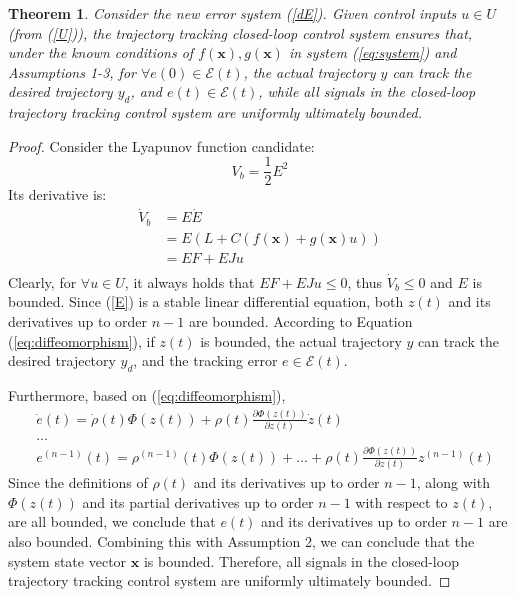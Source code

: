 \documentclass[preprint,12pt]{elsarticle}
\newtheorem{theorem}{Theorem}
\begin{document}
\begin{theorem}
Consider the new error system (\ref{dE}). Given control inputs \(u \in U\) (from (\ref{U})), the trajectory tracking closed-loop control system ensures that, under the known conditions of \(f(\mathbf{x}), g(\mathbf{x})\) in system (\ref{eq:system}) and Assumptions 1-3, for \(\forall e(0) \in \mathcal{E}(t)\), the actual trajectory \(y\) can track the desired trajectory \(y_d\), and \(e(t) \in \mathcal{E}(t)\), while all signals in the closed-loop trajectory tracking control system are uniformly ultimately bounded.
\end{theorem}

\begin{proof}
Consider the Lyapunov function candidate:
\begin{equation}
    V_b = \frac{1}{2}E^2
\end{equation}
Its derivative is:
\begin{equation}
    \begin{aligned}
        \dot{V}_b & = E\dot{E} \\
                & = E(L + C(f(\mathbf{x})+g(\mathbf{x})u)) \\
                & = EF + EJu \\
    \end{aligned}
\end{equation}
Clearly, for \(\forall u \in U\), it always holds that \(EF + EJu \leq 0\), thus \(\dot{V}_b \leq 0\) and \(E\) is bounded. Since (\ref{E}) is a stable linear differential equation, both \(z(t)\) and its derivatives up to order 
\(n-1\) are bounded. According to Equation (\ref{eq:diffeomorphism}), if \(z(t)\) is bounded, the actual trajectory \(y\) can track the desired trajectory \(y_d\), and the tracking error \(e \in \mathcal{E}(t)\).

Furthermore, based on (\ref{eq:diffeomorphism}),
\begin{equation}
    \begin{aligned}
        & \dot{e}(t) = \dot{\rho}(t)\Phi(z(t))+\rho(t)\frac{\partial \Phi(z(t))}{\partial z(t)}\dot{z}(t) \\
        & \dots \\
        & e^{(n-1)}(t) = \rho^{(n-1)}(t)\Phi(z(t))+\dots+\rho(t)\frac{\partial \Phi(z(t))}{\partial z(t)} z^{(n-1)}(t)
    \end{aligned}\label{dee}
\end{equation}
Since the definitions of \(\rho(t)\) and its derivatives up to order 
\(n-1\), along with \(\Phi(z(t))\) and its partial derivatives up to order \(n-1\) with respect to \(z(t)\), are all bounded, we conclude that \(e(t)\) and its derivatives up to order 
\(n-1\) are also bounded. Combining this with Assumption 2, we can conclude that the system state vector \(\mathbf{x}\) is bounded. Therefore, all signals in the closed-loop trajectory tracking control system are uniformly ultimately bounded.
\end{proof}
\end{document}

